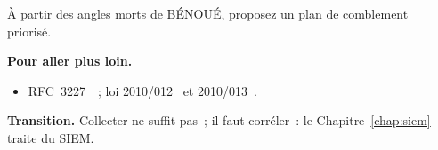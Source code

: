 \begin{boxexo}[title={\ding{45}\quad Exercice~4.10. Plan de comblement \niveauexpert}]
À partir des angles morts de BÉNOUÉ, proposez un plan de comblement priorisé.
\end{boxexo}

\bigskip

\begin{boxinfo}
\textbf{Pour aller plus loin.}
\begin{itemize}
    \item RFC~3227~\cite{rfc3227}~; loi 2010/012~\cite{loi2010012} et
          2010/013~\cite{loi2010013}.
\end{itemize}
\end{boxinfo}

\begin{boxinfo}
\textbf{Transition.} Collecter ne suffit pas~; il faut corréler~: le
Chapitre~\ref{chap:siem} traite du SIEM.
\end{boxinfo}
